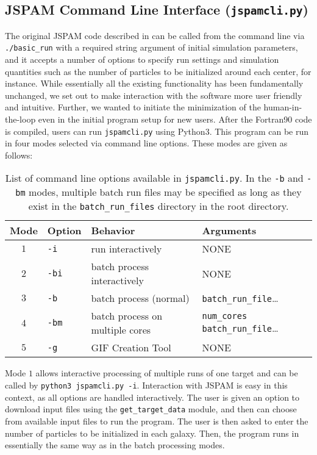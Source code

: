 \subsection{JSPAM Command Line Interface (\texttt{jspamcli.py})}
The original JSPAM code described in \citet{Wallin2016} can be called from
the command line via \texttt{./basic\_run} with a required string argument of
initial simulation parameters, and it accepts a number of options to specify
run settings and simulation quantities such as the number of particles to
be initialized around each center, for instance. While essentially all the
existing functionality has been fundamentally unchanged, we set out to make
interaction with the software more user friendly and intuitive.
Further, we wanted to
initiate the minimization of the human-in-the-loop even in the initial program
setup for new users.
After the Fortran90 code is compiled, users can run \texttt{jspamcli.py} using
Python3. This program can be run in four modes selected via command line
options. These modes are given as follows:
\begin{table}[h!]
    \centering
    \begin{tabular}{clll}
    \toprule
    Mode & Option       & Behavior                        & Arguments \\
    \midrule
    $1$ & \texttt{-i}  & run interactively               & NONE          \\
    $2$ & \texttt{-bi} & batch process interactively     & NONE          \\
    $3$ & \texttt{-b}  & batch process (normal)%
        & \texttt{batch\_run\_file}\ldots\\
    $4$ & \texttt{-bm} & batch process on multiple cores & \texttt{num\_cores}
    \texttt{batch\_run\_file}\ldots\\
    $5$ & \texttt{-g}  & GIF Creation Tool              & NONE          \\
    \bottomrule
    \end{tabular}
    \caption[\texttt{jspamcli.py} command line options]{List of command line options
        available in \texttt{jspamcli.py}. In the \texttt{-b} and \texttt{-bm}
    modes, multiple batch run files may be specified as long as they exist in
    the \texttt{batch\_run\_files} directory in the root directory.}
\end{table}
Mode $1$ allows interactive processing of multiple runs of one
target and can be called by \texttt{python3 jspamcli.py -i}.
Interaction with JSPAM is easy in this context, as all options are
handled interactively. The user is given an option to download input files using
the \texttt{get\_target\_data} module, and then can choose from available input
files to run the program. The user is then asked to enter the number of
particles to be initialized in each galaxy. Then, the program runs in
essentially the same way as in the batch processing modes.

